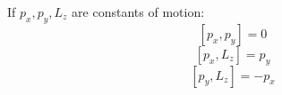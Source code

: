 \documentclass[12pt]{article}
\begin{document}
	If $p_x, p_y, L_z$ are constants of motion:
	$$
	[p_x, p_y] = 0
	$$
	$$
	[p_x, L_z] = p_y
	$$
	$$
	[p_y, L_z] = -p_x
	$$
%	
%	
%	
%	
%	
\end{document}
